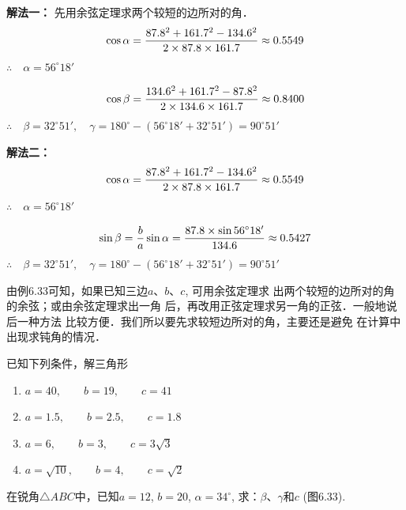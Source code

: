 \begin{solution}
\textbf{解法一：} 先用余弦定理求两个较短的边所对的角．
\[\cos\alpha=\dfrac{87.8^2+161.7^2-134.6^2}{2\times 87.8\times 161.7}\approx 0.5549\]
$\therefore\quad \alpha=56^{\circ}18'$

\[\cos\beta=\dfrac{134.6^2+161.7^2-87.8^2}{2\times134.6\times161.7}\approx 0.8400\]
$\therefore\quad \beta=32^{\circ}51',\quad 
\gamma=180^{\circ}-(56^{\circ}18'+32^{\circ}51')=90^{\circ}51'$

\textbf{解法二：} 
\[\cos\alpha=\dfrac{87.8^2+161.7^2-134.6^2}{2\times 87.8\times 161.7}\approx 0.5549\]
$\therefore\quad \alpha=56^{\circ}18'$
    
\[\sin\beta=\dfrac{b}{a}\sin\alpha=\dfrac{87.8\times \sin 56^{\circ}18'}{134.6}\approx 0.5427\]
$\therefore\quad \beta=32^{\circ}51', \quad \gamma=180^{\circ}-(56^{\circ}18'+32^{\circ}51')=90^{\circ}51'$
\end{solution}

由例6.33可知，如果已知三边$a$、$b$、$c$, 可用余弦定理求
出两个较短的边所对的角的余弦；或由余弦定理求出一角
后，再改用正弦定理求另一角的正弦．一般地说后一种方法
比较方便．我们所以要先求较短边所对的角，主要还是避免
在计算中出现求钝角的情况．

\begin{ex}
    已知下列条件，解三角形
\begin{enumerate}
\item $a=40,\qquad b=19,\qquad c=41$
\item $a=1.5,\qquad b=2.5,\qquad c=1.8$
\item $a=6,\qquad b=3,\qquad c=3\sqrt{3}$
\item $a=\sqrt{10},\qquad b=4,\qquad c=\sqrt{2}$   
\end{enumerate}
\end{ex}

\begin{example}
    在锐角$\triangle ABC$中，已知$a=12$, $b=20$, $\alpha=34^{\circ}$, 
    求：$\beta$、$\gamma$和$c$ (图6.33).
\end{example}

\begin{figure}[htp]
    \centering
{}
    \caption{}
\end{figure}


